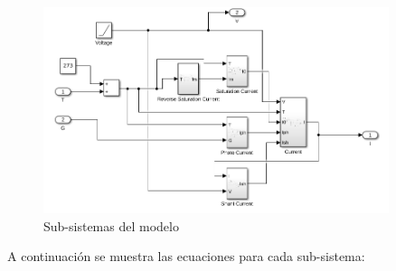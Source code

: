 \documentclass[a4paper,12pt]{article}
\begin{document}
	\begin{figure}[htb]
		\centering
		\includegraphics[width=0.9\textwidth]{./imagenes/simulink2.png}
		\caption{Sub-sistemas del modelo}
	\end{figure} 
	
	A continuación se muestra las ecuaciones para cada sub-sistema:
	
\end{document}
